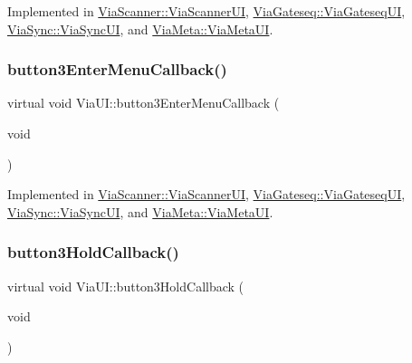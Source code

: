 Implemented in \mbox{\hyperlink{class_via_scanner_1_1_via_scanner_u_i_a18b25c095ac7d6aca3bbc7274643ed9a}{Via\+Scanner\+::\+Via\+Scanner\+UI}}, \mbox{\hyperlink{class_via_gateseq_1_1_via_gateseq_u_i_a9c198960d6fee0bc78d6e24eb18810b1}{Via\+Gateseq\+::\+Via\+Gateseq\+UI}}, \mbox{\hyperlink{class_via_sync_1_1_via_sync_u_i_ac1a33313bc6c5c1f07b3a8cb3094a700}{Via\+Sync\+::\+Via\+Sync\+UI}}, and \mbox{\hyperlink{class_via_meta_1_1_via_meta_u_i_a3d9aa9b0cc62a32b79541e25bbec6bd5}{Via\+Meta\+::\+Via\+Meta\+UI}}.

\mbox{\label{class_via_u_i_a883081e46324dec82ad89f2e77cf4b65}} 
\subsubsection{\texorpdfstring{button3\+Enter\+Menu\+Callback()}{button3EnterMenuCallback()}}
{\footnotesize\ttfamily virtual void Via\+U\+I\+::button3\+Enter\+Menu\+Callback (\begin{DoxyParamCaption}\item[{void}]{ }\end{DoxyParamCaption})\hspace{0.3cm}{\ttfamily [pure virtual]}}



Implemented in \mbox{\hyperlink{class_via_scanner_1_1_via_scanner_u_i_a32f8e4caa95371961883c90a5803f314}{Via\+Scanner\+::\+Via\+Scanner\+UI}}, \mbox{\hyperlink{class_via_gateseq_1_1_via_gateseq_u_i_a634b6fe2c13f90490b6e8182b4854425}{Via\+Gateseq\+::\+Via\+Gateseq\+UI}}, \mbox{\hyperlink{class_via_sync_1_1_via_sync_u_i_a695a9d89eaf1b1e03bba057e4f89b3c2}{Via\+Sync\+::\+Via\+Sync\+UI}}, and \mbox{\hyperlink{class_via_meta_1_1_via_meta_u_i_abff70e527b92121c207699c8c8334ee6}{Via\+Meta\+::\+Via\+Meta\+UI}}.

\mbox{\label{class_via_u_i_a7334aea36cf78afac284dd5e899e8ace}} 
\subsubsection{\texorpdfstring{button3\+Hold\+Callback()}{button3HoldCallback()}}
{\footnotesize\ttfamily virtual void Via\+U\+I\+::button3\+Hold\+Callback (\begin{DoxyParamCaption}\item[{void}]{ }\end{DoxyParamCaption})\hspace{0.3cm}{\ttfamily [pure virtual]}}



